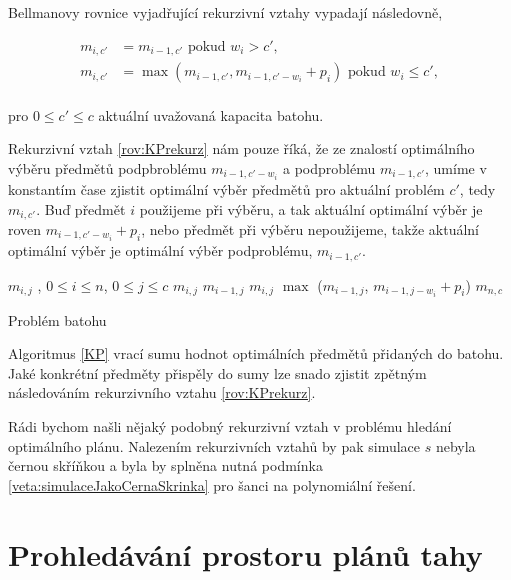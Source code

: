 Bellmanovy rovnice vyjadřující rekurzivní vztahy vypadají následovně,

\begin{definice}\label{rov:KPrekurz}
  \begin{align*}
    m_{i, c'} &= m_{i - 1, c'} \text{ pokud } w_i > c', \\
    m_{i, c'} &= \max (m_{i - 1, c'}, m_{i - 1, c' - w_i} + p_i) \text{ pokud } w_i \leq c',
  \end{align*}
  \\
  pro $0 \leq c' \leq c$ aktuální uvažovaná kapacita batohu.
\end{definice}

Rekurzivní vztah \ref{rov:KPrekurz} nám pouze říká, že ze znalostí optimálního výběru předmětů podpbroblému $m_{i-1, c' - w_i}$ a podproblému $m_{i - 1, c'}$,
umíme v konstantím čase zjistit optimální výběr předmětů pro aktuální problém $c'$, tedy $m_{i, c'}$.
Buď předmět $i$ použijeme při výběru, a tak aktuální optimální výběr je roven $m_{i - 1, c' - w_i} + p_i$,
nebo předmět při výběru nepoužijeme, takže aktuální optimální výběr je optimální výběr podproblému, $m_{i - 1, c'}$. 

\begin{algorithm}[h]
  \begin{algorithmic}[1]
    \State $m_{i, j}$ , $0 \leq i \leq n$, $0 \leq j \leq c$
          \State $m_{i, j}$ \gets $m_{i - 1, j}$
        \Else
          \State $m_{i, j}$ \gets $\max$ ($m_{i - 1, j}$, $m_{i - 1, j - w_i} + p_i$)
        \EndIf
      \EndFor
    \EndFor
    \State \Return $m_{n,c}$
  \EndFunction
  \end{algorithmic}
  \caption{Problém batohu}
  \label{KP}
\end{algorithm}

Algoritmus \ref{KP} vrací sumu hodnot optimálních předmětů přidaných do batohu.
Jaké konkrétní předměty přispěly do sumy lze snado zjistit zpětným následováním rekurzivního vztahu \ref{rov:KPrekurz}.

Rádi bychom našli nějaký podobný rekurzivní vztah v problému hledání optimálního plánu.
Nalezením rekurzivních vztahů by pak simulace $s$ nebyla černou skříňkou a byla by splněna nutná podmínka \ref{veta:simulaceJakoCernaSkrinka} pro šanci na polynomiální řešení.

\section{Prohledávání prostoru plánů tahy}

